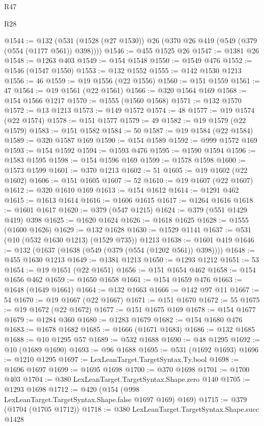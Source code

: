 \begin{lexlean}{R47}
\begin{lexlean}{R28}
\begin{coremodule}
{{{{{{{{{{{{{{{{{{{{{{{{{{{{{{{{{{{{{{{{{{{{{{{{{{{{{{{{{{{{{{{{{{{{{{{{{{{{{{{{{{{{{{{{{{{{{{{{{{{{{{{{{{{{{{{{{{{{{{{{{{{{{{{{{{{{{@1544 := @132 (@531 (@1528 (@27 @1530)) @26 (@370 @26 @419 (@549 (@379 (@554 (@1177 @561)) @398))))
@1546 := @455 @1525 @26
@1547 := @1381 @26
@1548 := @1263 @403
@1549 := @154 @1548
@1550 := @1549 @476
@1552 := @1546 (@1547 @1550)
@1553 := @132 @1552
@1555 := @142 @1530 @1213
@1556 := 46
@1559 := @19 @1556 (@22 @1556)
@1560 := @151 @1559
@1561 := 47
@1564 := @19 @1561 (@22 @1561)
@1566 := @320 @1564 @169
@1568 := @154 @1566 @1217
@1570 := @1555 (@1560 @1568)
@1571 := @132 @1570
@1572 := @13 @1213
@1573 := @149 @1572
@1574 := 48
@1577 := @19 @1574 (@22 @1574)
@1578 := @151 @1577
@1579 := 49
@1582 := @19 @1579 (@22 @1579)
@1583 := @151 @1582
@1584 := 50
@1587 := @19 @1584 (@22 @1584)
@1589 := @320 @1587 @169
@1590 := @154 @1589
@1592 := @999 @1572 @169
@1593 := @154 @1592
@1594 := @1593 @476
@1595 := @1590 @1594
@1596 := @1583 @1595
@1598 := @154 @1596 @169
@1599 := @1578 @1598
@1600 := @1573 @1599
@1601 := @370 @1213
@1602 := 51
@1605 := @19 @1602 (@22 @1602)
@1606 := @151 @1605
@1607 := 52
@1610 := @19 @1607 (@22 @1607)
@1612 := @320 @1610 @169
@1613 := @154 @1612
@1614 := @1291 @462
@1615 := @1613 @1614
@1616 := @1606 @1615
@1617 := @1264 @1616
@1618 := @1601 @1617
@1620 := @379 (@547 @1215)
@1624 := @379 (@551 @1429 @419) @398
@1625 := @1620 @1624
@1626 := @1618 @1625
@1628 := @1555 (@1600 @1626)
@1629 := @132 @1628
@1630 := @1529 @1141
@1637 := @531 (@10 (@532 @1630 @1213) (@1529 @735)) @1213
@1638 := @1601 @419
@1646 := @132 (@1637 (@1638 (@549 (@379 (@554 (@1202 @561)) @398))))
@1648 := @455 @1630 @1213
@1649 := @1381 @1213
@1650 := @1293 @1212
@1651 := 53
@1654 := @19 @1651 (@22 @1651)
@1656 := @151 @1654 @462
@1658 := @154 @1656 @462
@1659 := @1650 @1658
@1661 := @154 @1659 @476
@1663 := @1648 (@1649 @1661)
@1664 := @132 @1663
@1666 := @142 @97 @11
@1667 := 54
@1670 := @19 @1667 (@22 @1667)
@1671 := @151 @1670
@1672 := 55
@1675 := @19 @1672 (@22 @1672)
@1677 := @151 @1675 @169
@1678 := @154 @1677
@1679 := @1284 @360
@1680 := @1283 @1679
@1682 := @154 @1680 @476
@1683 := @1678 @1682
@1685 := @1666 (@1671 @1683)
@1686 := @132 @1685
@1688 := @10 @1295 @57
@1689 := @532 @1688
@1690 := @48 @1295
@1692 := @10 (@1689 @1690)
@1693 := @96 @1688
@1695 := @531 (@1692 @1693)
@1696 := @1210 @1295
@1697 := LexLeanTarget.TargetSyntax.Ty.bool
@1698 := @1696 @1697
@1699 := @1695 @1698
@1700 := @370 @1698
@1701 := @1700 @403
@1704 := @380 LexLeanTarget.TargetSyntax.Shape.zero @140
@1705 := @1293 @1698
@1712 := @420 (@154 (@998 LexLeanTarget.TargetSyntax.Shape.false @1697 @169) @169)
@1715 := @379 (@1704 (@1705 @1712))
@1718 := @380 LexLeanTarget.TargetSyntax.Shape.succ @1428
}}}}}}}}}}}}}}}}}}}}}}}}}}}}}}}}}}}}}}}}}}}}}}}}}}}}}}}}}}}}}}}}}}}}}}}}}}}}}}}}}}}}}}}}}}}}}}}}}}}}}}}}}}}}}}}}}}}}}}}}}}}}}}}}}}}}}
\end{coremodule}
\end{lexlean}
\end{lexlean}
